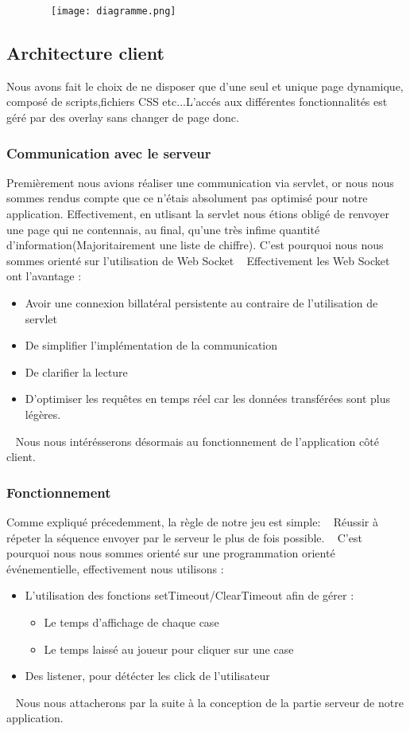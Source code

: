 \documentclass[12pt]{article}
\begin{document}
~~~~~~~~\texttt{[image: diagramme.png]}
\newpage
\subsection{Architecture client}
Nous avons fait le choix de ne disposer que d'une seul et unique page dynamique, composé de scripts,fichiers CSS etc...L'accés aux différentes fonctionnalités est géré par des overlay sans changer de page donc. 
\subsubsection{Communication avec le serveur}
Premièrement nous avions réaliser une communication via servlet, or nous nous sommes rendus compte que ce n'étais absolument pas optimisé pour notre application. Effectivement, en utlisant la servlet nous étions obligé de renvoyer une page qui ne contennais, au final, qu'une très infime quantité d'information(Majoritairement une liste de chiffre).
C'est pourquoi nous nous sommes orienté sur l'utilisation de Web Socket
~\newline 
Effectivement les Web Socket ont l'avantage : 
\begin{itemize}
\item Avoir une connexion billatéral persistente au contraire de l'utilisation de servlet
\item De simplifier l'implémentation de la communication
\item De clarifier la lecture
\item D'optimiser les requêtes en temps réel car les données transférées sont plus légères.
\end{itemize}
~\newline
Nous nous intérésserons désormais au fonctionnement de l'application côté client.
\subsubsection{Fonctionnement}
Comme expliqué précedemment, la règle de notre jeu est simple:
~\newline
Réussir à répeter la séquence envoyer par le serveur le plus de fois possible.
~\newline
C'est pourquoi nous nous sommes orienté sur une programmation orienté événementielle, effectivement nous utilisons : 
\begin{itemize}
\item L'utilisation des fonctions setTimeout/ClearTimeout afin de gérer : 
\begin{itemize}
\item Le temps d'affichage de chaque case
\item Le temps laissé au joueur pour cliquer sur une case
\end{itemize}
\item Des listener, pour détécter les click de l'utilisateur
\end{itemize}
~\newline
Nous nous attacherons par la suite à la conception de la partie serveur de notre application.
\end{document}
